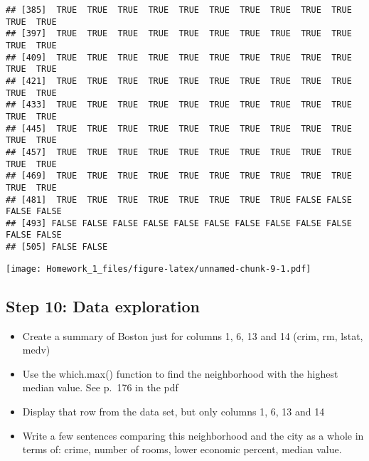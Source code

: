 \documentclass[
]{article}
\newenvironment{Shaded}{\begin{snugshade}}{\end{snugshade}}
\newcommand{\AttributeTok}[1]{\textcolor[rgb]{0.77,0.63,0.00}{#1}}
\newcommand{\ConstantTok}[1]{\textcolor[rgb]{0.00,0.00,0.00}{#1}}
\newcommand{\DecValTok}[1]{\textcolor[rgb]{0.00,0.00,0.81}{#1}}
\newcommand{\FunctionTok}[1]{\textcolor[rgb]{0.00,0.00,0.00}{#1}}
\newcommand{\NormalTok}[1]{#1}
\newcommand{\OtherTok}[1]{\textcolor[rgb]{0.56,0.35,0.01}{#1}}
\newcommand{\SpecialCharTok}[1]{\textcolor[rgb]{0.00,0.00,0.00}{#1}}
\newcommand{\StringTok}[1]{\textcolor[rgb]{0.31,0.60,0.02}{#1}}
\providecommand{\tightlist}{%
  \setlength{\itemsep}{0pt}\setlength{\parskip}{0pt}}
\begin{document}
\begin{verbatim}
## [385]  TRUE  TRUE  TRUE  TRUE  TRUE  TRUE  TRUE  TRUE  TRUE  TRUE  TRUE  TRUE
## [397]  TRUE  TRUE  TRUE  TRUE  TRUE  TRUE  TRUE  TRUE  TRUE  TRUE  TRUE  TRUE
## [409]  TRUE  TRUE  TRUE  TRUE  TRUE  TRUE  TRUE  TRUE  TRUE  TRUE  TRUE  TRUE
## [421]  TRUE  TRUE  TRUE  TRUE  TRUE  TRUE  TRUE  TRUE  TRUE  TRUE  TRUE  TRUE
## [433]  TRUE  TRUE  TRUE  TRUE  TRUE  TRUE  TRUE  TRUE  TRUE  TRUE  TRUE  TRUE
## [445]  TRUE  TRUE  TRUE  TRUE  TRUE  TRUE  TRUE  TRUE  TRUE  TRUE  TRUE  TRUE
## [457]  TRUE  TRUE  TRUE  TRUE  TRUE  TRUE  TRUE  TRUE  TRUE  TRUE  TRUE  TRUE
## [469]  TRUE  TRUE  TRUE  TRUE  TRUE  TRUE  TRUE  TRUE  TRUE  TRUE  TRUE  TRUE
## [481]  TRUE  TRUE  TRUE  TRUE  TRUE  TRUE  TRUE  TRUE FALSE FALSE FALSE FALSE
## [493] FALSE FALSE FALSE FALSE FALSE FALSE FALSE FALSE FALSE FALSE FALSE FALSE
## [505] FALSE FALSE
\end{verbatim}

\begin{Shaded}
\end{Shaded}

\texttt{[image: Homework\_1\_files/figure-latex/unnamed-chunk-9-1.pdf]}

\hypertarget{step-10-data-exploration}{%
\subsection{Step 10: Data exploration}\label{step-10-data-exploration}}

\begin{itemize}
\tightlist
\item
  Create a summary of Boston just for columns 1, 6, 13 and 14 (crim, rm,
  lstat, medv)
\item
  Use the which.max() function to find the neighborhood with the highest
  median value. See p.~176 in the pdf
\item
  Display that row from the data set, but only columns 1, 6, 13 and 14
\item
  Write a few sentences comparing this neighborhood and the city as a
  whole in terms of: crime, number of rooms, lower economic percent,
  median value.
\end{itemize}
\end{document}

